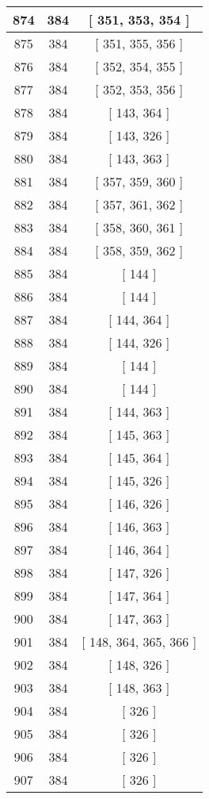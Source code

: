 \begin{center}
\begin{longtable}[H]{|| c c c ||}
\hline
874 & 384 & [ 351, 353, 354 ] \\ 
\hline
875 & 384 & [ 351, 355, 356 ] \\ 
\hline
876 & 384 & [ 352, 354, 355 ] \\ 
\hline
877 & 384 & [ 352, 353, 356 ] \\ 
\hline
878 & 384 & [ 143, 364 ] \\ 
\hline
879 & 384 & [ 143, 326 ] \\ 
\hline
880 & 384 & [ 143, 363 ] \\ 
\hline
881 & 384 & [ 357, 359, 360 ] \\ 
\hline
882 & 384 & [ 357, 361, 362 ] \\ 
\hline
883 & 384 & [ 358, 360, 361 ] \\ 
\hline
884 & 384 & [ 358, 359, 362 ] \\ 
\hline
885 & 384 & [ 144 ] \\ 
\hline
886 & 384 & [ 144 ] \\ 
\hline
887 & 384 & [ 144, 364 ] \\ 
\hline
888 & 384 & [ 144, 326 ] \\ 
\hline
889 & 384 & [ 144 ] \\ 
\hline
890 & 384 & [ 144 ] \\ 
\hline
891 & 384 & [ 144, 363 ] \\ 
\hline
892 & 384 & [ 145, 363 ] \\ 
\hline
893 & 384 & [ 145, 364 ] \\ 
\hline
894 & 384 & [ 145, 326 ] \\ 
\hline
895 & 384 & [ 146, 326 ] \\ 
\hline
896 & 384 & [ 146, 363 ] \\ 
\hline
897 & 384 & [ 146, 364 ] \\ 
\hline
898 & 384 & [ 147, 326 ] \\ 
\hline
899 & 384 & [ 147, 364 ] \\ 
\hline
900 & 384 & [ 147, 363 ] \\ 
\hline
901 & 384 & [ 148, 364, 365, 366 ] \\ 
\hline
902 & 384 & [ 148, 326 ] \\ 
\hline
903 & 384 & [ 148, 363 ] \\ 
\hline
904 & 384 & [ 326 ] \\ 
\hline
905 & 384 & [ 326 ] \\ 
\hline
906 & 384 & [ 326 ] \\ 
\hline
907 & 384 & [ 326 ] \\ 
\hline

\end{longtable}
\end{center}
